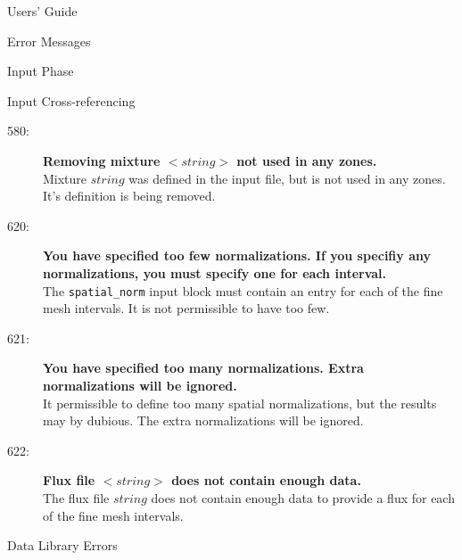 \begin{chapter}{Users' Guide\label{app:user.guide}}
\begin{section}{Error Messages}
\begin{subsection}{Input Phase}
      \begin{subsubsection}{Input Cross-referencing}
        \begin{description}
        \item[580:]\textbf{Removing mixture $<\!\!string\!\!>$ not
            used in any zones.}\ \\
          Mixture $string$ was defined in the input file, but is not
          used in any zones.  It's definition is being removed.
        \item[620:]\textbf{You have specified too few normalizations.
            If you specifiy any normalizations, you must specify one
            for each interval.}\ \\
          The \texttt{spatial\_norm} input block must contain an entry
          for each of the fine mesh intervals.  It is not permissible
          to have too few.
        \item[621:]\textbf{You have specified too many normalizations.
            Extra normalizations will be ignored.}\ \\
          It permissible to define too many spatial normalizations,
          but the results may by dubious.  The extra normalizations
          will be ignored.
        \item[622:]\textbf{Flux file $<\!\!string\!\!>$ does not
            contain enough data.}\ \\
          The flux file $string$ does not contain enough data to
          provide a flux for each of the fine mesh intervals.
        \end{description}    
      \end{subsubsection}
    \end{subsection}
    
    \begin{subsection}{Data Library Errors}
      

\end{subsection}
\end{section}
\end{chapter}
